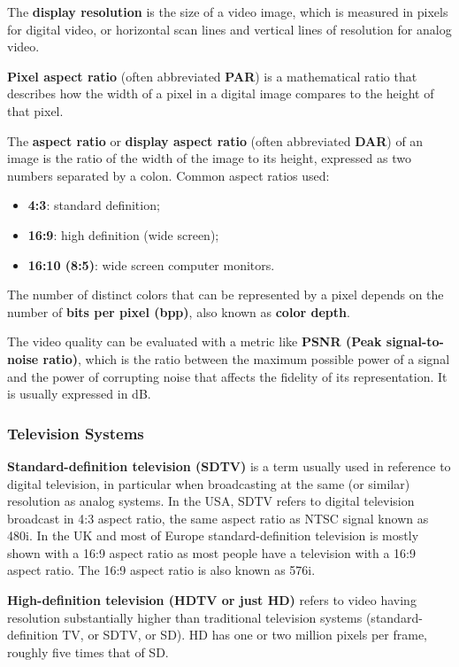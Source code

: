 The \textbf{display resolution} is the size of a video image, which is
measured in pixels for digital video, or horizontal scan lines and vertical
lines of resolution for analog video.

\textbf{Pixel aspect ratio} (often abbreviated \textbf{PAR}) is a mathematical
ratio that describes how the width of a pixel in a digital image compares to
the height of that pixel.

The \textbf{aspect ratio} or \textbf{display aspect ratio} (often abbreviated
\textbf{DAR}) of an image is the ratio of the width of the image to its
height, expressed as two numbers separated by a colon. Common aspect ratios
used:
\begin{itemize}
  \item \textbf{4:3}: standard definition;
  \item \textbf{16:9}: high definition (wide screen);
  \item \textbf{16:10 (8:5)}: wide screen computer monitors.
\end{itemize}

The number of distinct colors that can be represented by a pixel depends on
the number of \textbf{bits per pixel (bpp)}, also known as \textbf{color
depth}.

The video quality can be evaluated with a metric like \textbf{PSNR (Peak
signal-to-noise ratio)}, which is the ratio between the maximum possible power
of a signal and the power of corrupting noise that affects the fidelity of its
representation. It is usually expressed in dB.

\subsubsection{Television Systems}

\textbf{Standard-definition television (SDTV)} is a term usually used in
reference to digital television, in particular when broadcasting at the same
(or similar) resolution as analog systems. In the USA, SDTV refers to digital
television broadcast in 4:3 aspect ratio, the same aspect ratio as NTSC signal
known as 480i. In the UK and most of Europe standard-definition television is
mostly shown with a 16:9 aspect ratio as most people have a television with a
16:9 aspect ratio. The 16:9 aspect ratio is also known as 576i.

\textbf{High-definition television (HDTV or just HD)} refers to video having
resolution substantially higher than traditional television systems
(standard-definition TV, or SDTV, or SD). HD has one or two million pixels per
frame, roughly five times that of SD.

